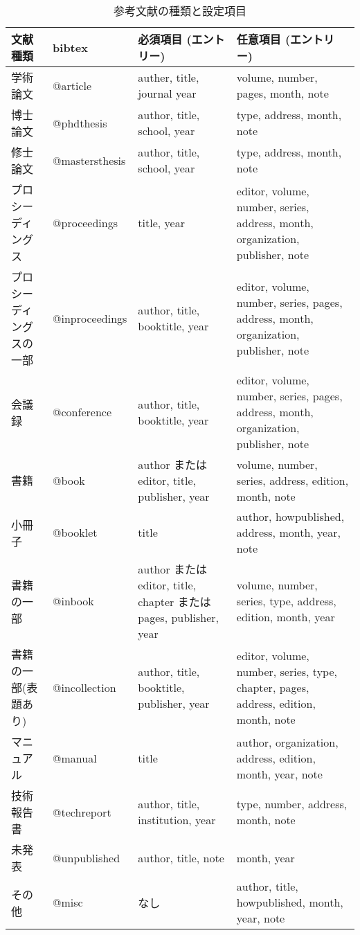 \documentclass[a4paper]{ltjsarticle}
\begin{document}
\begin{table}[H]
\begin{center}
\caption{参考文献の種類と設定項目}
\begin{tabular}{p{2cm}lp{4cm}p{5cm}}
文献種類                 & bibtex          & 必須項目 (エントリー)            & 任意項目 (エントリー) \\
\hline
学術論文                 & @article        & auther, title, journal year      & volume, number, pages, month, note \\
博士論文                 & @phdthesis      & author, title, school, year      & type, address, month, note \\
修士論文                 & @mastersthesis  & author, title, school, year      & type, address, month, note \\
プロシーディングス       & @proceedings    & title, year                      & editor, volume, number, series, address, month, organization, publisher, note \\
プロシーディングスの一部 & @inproceedings  & author, title, booktitle, year   & editor, volume, number, series, pages, address, month, organization, publisher, note \\
会議録                   & @conference     & author, title, booktitle, year   & editor, volume, number, series, pages, address, month, organization, publisher, note \\
書籍                     & @book           & author または editor, title, publisher, year & volume, number, series, address, edition, month, note \\
小冊子                   & @booklet        & title                            & author, howpublished, address, month, year, note \\
書籍の一部               & @inbook         & author または editor, title, chapter または pages, publisher, year & volume, number, series, type, address, edition, month, year \\
書籍の一部(表題あり)     & @incollection   & author, title, booktitle, publisher, year & editor, volume, number, series, type, chapter, pages, address, edition, month, note \\
マニュアル               & @manual         & title                            & author, organization, address, edition, month, year, note \\
技術報告書               & @techreport     & author, title, institution, year & type, number, address, month, note \\
未発表                   & @unpublished    & author, title, note              & month, year \\
その他                   & @misc           & なし                             & author, title, howpublished, month, year, note \\
\end{tabular}
\label{tbl:bibtexentry}
\end{center}
\end{table}
\end{document}

